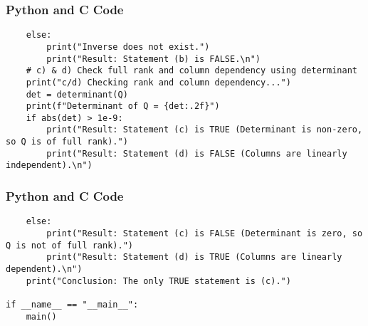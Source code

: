 \documentclass{beamer}
\begin{document}
\begin{frame}[fragile]
\frametitle{Python and C Code}
\begin{lstlisting}
    else:
        print("Inverse does not exist.")
        print("Result: Statement (b) is FALSE.\n")
    # c) & d) Check full rank and column dependency using determinant
    print("c/d) Checking rank and column dependency...")
    det = determinant(Q)
    print(f"Determinant of Q = {det:.2f}")
    if abs(det) > 1e-9:
        print("Result: Statement (c) is TRUE (Determinant is non-zero, so Q is of full rank).")
        print("Result: Statement (d) is FALSE (Columns are linearly independent).\n")
\end{lstlisting}
\end{frame}

\begin{frame}[fragile]
\frametitle{Python and C Code}
\begin{lstlisting}
    else:
        print("Result: Statement (c) is FALSE (Determinant is zero, so Q is not of full rank).")
        print("Result: Statement (d) is TRUE (Columns are linearly dependent).\n")
    print("Conclusion: The only TRUE statement is (c).")

if __name__ == "__main__":
    main()
\end{lstlisting}
\end{frame}
\end{document}
